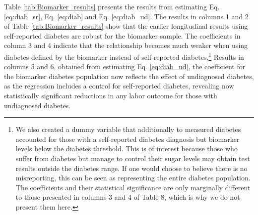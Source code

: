 \documentclass[12pt,english]{article}
\begin{document}
Table \ref{tab:Biomarker_results} presents the results from estimating Eq. \ref{eq:diab_sr}, Eq. \ref{eq:diab} and Eq. \ref{eq:diab_ud}.  
The results in columns 1 and 2 of Table \ref{tab:Biomarker_results} show that the earlier longitudinal results using self-reported diabetes are robust for the biomarker sample. The coefficients in column 3 and 4 indicate that the relationship becomes much weaker when using diabetes defined by the biomarker instead of self-reported diabetes.\footnote{We also created a dummy variable that additionally to measured diabetes accounted for those with a self-reported diabetes diagnosis but biomarker levels below the diabetes threshold. This is of interest because those who suffer from diabetes but manage to control their sugar levels may obtain test results outside the diabetes range.  If one would choose to believe there is no misreporting, this can be seen as representing the entire diabetes population. The coefficients and their statistical significance are only marginally different to those presented in columns 3 and 4 of Table 8, which is why we do not present them here.} Results in columns 5 and 6, obtained from estimating Eq. \ref{eq:diab_ud}, the coefficient for the biomarker diabetes population now reflects the effect of undiagnosed diabetes, as the regression includes a control for self-reported diabetes, revealing now statistically significant reductions in any labor outcome for those with undiagnosed diabetes. 
\end{document}
